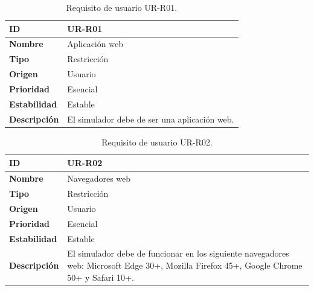 \begin{center}
\begin{table}[htbp]
\centering
\begin{tabular}{@{}p{2.5cm} p{9cm}@{}} 
\toprule
\textbf{ID} 				& UR-R01 \\
\midrule
\textbf{Nombre} 			& Aplicación web\\
\midrule
\textbf{Tipo} 			& Restricción \\
\midrule
\textbf{Origen} 			& Usuario \\
\midrule
\textbf{Prioridad}		& Esencial \\
\midrule
\textbf{Estabilidad} 		& Estable \\
\midrule
\textbf{Descripción} 	& El simulador debe de ser una aplicación web. \\
\bottomrule
\end{tabular}
\caption{Requisito de usuario UR-R01.}
\label{tab:urr01}
\end{table}
\end{center}

\begin{center}
\begin{table}[htbp]
\centering
\begin{tabular}{@{}p{2.5cm} p{9cm}@{}} 
\toprule
\textbf{ID} 				& UR-R02 \\
\midrule
\textbf{Nombre} 			& Navegadores web \\
\midrule
\textbf{Tipo} 			& Restricción \\
\midrule
\textbf{Origen} 			& Usuario \\
\midrule
\textbf{Prioridad}		& Esencial \\
\midrule
\textbf{Estabilidad} 		& Estable \\
\midrule
\textbf{Descripción} 	& El simulador debe de funcionar en los siguiente navegadores web: Microsoft Edge 30+, Mozilla Firefox 45+, Google Chrome 50+ y Safari 10+. \\
\bottomrule
\end{tabular}
\caption{Requisito de usuario UR-R02.}
\label{tab:urr02}
\end{table}
\end{center}

